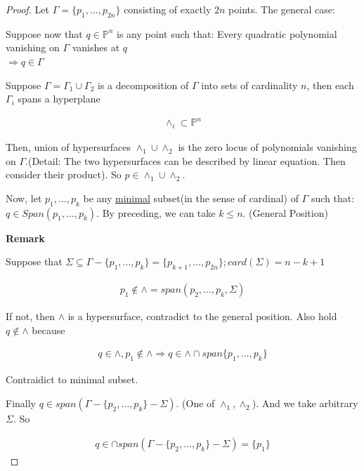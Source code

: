 \documentclass[Total.tex]{subfiles}
\begin{document}
			\begin{proof}
				Let $\Gamma=\{p_{1},\dots,p_{2n}\}$ consisting of exactly $2n$ points. The general case:
				
				\begin{center}
					Suppose now that $q\in \mathbb{P}^n$ is any point such that: Every quadratic polynomial vanishing on $\Gamma$ vanishes at $q$\\
					$\Rightarrow q\in \Gamma$ 
				\end{center}
				
				Suppose $\Gamma=\Gamma_1\cup \Gamma_2$ is a decomposition of $\Gamma$ into sets of cardinality $n$, then each $\Gamma_i$ spans a hyperplane 
				
				\begin{gather*}
					\wedge_i\subset \mathbb{P}^n
				\end{gather*}
				
				Then, union of hypersurfaces $\wedge_1\cup \wedge_2$ is the zero locus of polynomials vanishing on $\Gamma$.(Detail: The two hypersurfaces can be described by linear equation. Then consider their product). So $p\in \wedge_1\cup \wedge_2$.
				
				Now, let $p_1,\dots,p_k$ be any \underline{minimal} subset(in the sense of cardinal) of $\Gamma$ such that: $q\in Span(p_1,\dots,p_k)$. By preceding, we can take $k\leq n$. (General Position)
				
				\textbf{Remark} 
				
				Suppose that $\Sigma\subseteq \Gamma-\{p_1,\dots,p_k\}=\{p_{k+1},\dots,p_{2n}\};card(\Sigma)=n-k+1$
				
				\begin{gather*}
					p_1\notin \wedge=span(p_2,\dots,p_k,\Sigma)
				\end{gather*}
				
				If not, then $\wedge$ is a hypersurface, contradict to the general position. Also hold $q\notin \wedge$ because 
				
				\begin{gather*}
					q\in \wedge,p_1\notin \wedge\Rightarrow q\in \wedge\cap span\{p_1,\dots,p_k\}
				\end{gather*}
				
				Contraidict to minimal subset.
				
				Finally $q\in span(\Gamma-\{p_2,\dots,p_k\}-\Sigma)$. (One of $\wedge_1,\wedge_2$). And we take arbitrary $\Sigma$. So
				
				\begin{gather*}
					q\in \cap span(\Gamma-\{p_2,\dots,p_k\}-\Sigma)=\{p_1\}
				\end{gather*}
				
			\end{proof}
			
\end{document}

